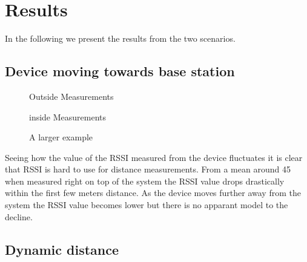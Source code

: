 \section{Results}
\label{sec_results}

In the following we present the results from the two scenarios.

\subsection{Device moving towards base station}

\begin{figure}		



\caption{ Outside Measurements }
\label{graf_OutsideMesurements}

\end{figure}

\begin{figure}		
	
	
	
	\caption{ inside Measurements }
	\label{graf_InsideMesurements}
	
\end{figure}


\begin{figure}
	
	
	\caption{A larger example}
\end{figure}

Seeing how the value of the RSSI measured from the device fluctuates it is clear that RSSI is hard to use for distance measurements. From a mean around 45 when measured right on top of the system the RSSI value drops drastically within the first few meters distance. As the device moves further away from the system the RSSI value becomes lower but there is no apparant model to the decline.

\subsection{Dynamic distance}
